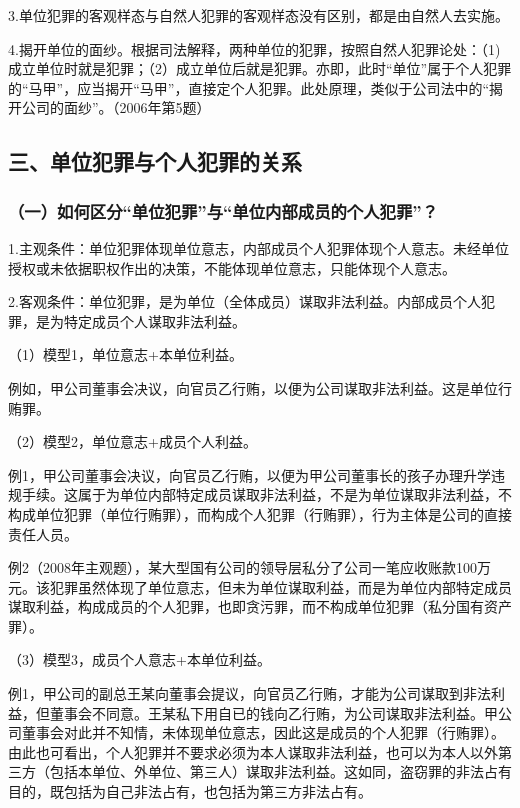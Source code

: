 3.单位犯罪的客观样态与自然人犯罪的客观样态没有区别，都是由自然人去实施。

4.揭开单位的面纱。根据司法解释，两种单位的犯罪，按照自然人犯罪论处：（1)成立单位时就是犯罪；（2）成立单位后就是犯罪。亦即，此时“单位”属于个人犯罪的“马甲”，应当揭开“马甲”，直接定个人犯罪。此处原理，类似于公司法中的“揭开公司的面纱”。（2006年第5题）

\subsection*{三、单位犯罪与个人犯罪的关系}

\subsubsection*{（一）如何区分“单位犯罪”与“单位内部成员的个人犯罪”？}

1.主观条件：单位犯罪体现单位意志，内部成员个人犯罪体现个人意志。未经单位授权或未依据职权作出的决策，不能体现单位意志，只能体现个人意志。

2.客观条件：单位犯罪，是为单位（全体成员）谋取非法利益。内部成员个人犯罪，是为特定成员个人谋取非法利益。


（1）模型1，单位意志+本单位利益。

例如，甲公司董事会决议，向官员乙行贿，以便为公司谋取非法利益。这是单位行贿罪。

（2）模型2，单位意志+成员个人利益。

例1，甲公司董事会决议，向官员乙行贿，以便为甲公司董事长的孩子办理升学违规手续。这属于为单位内部特定成员谋取非法利益，不是为单位谋取非法利益，不构成单位犯罪（单位行贿罪），而构成个人犯罪（行贿罪），行为主体是公司的直接责任人员。

例2（2008年主观题），某大型国有公司的领导层私分了公司一笔应收账款100万元。该犯罪虽然体现了单位意志，但未为单位谋取利益，而是为单位内部特定成员谋取利益，构成成员的个人犯罪，也即贪污罪，而不构成单位犯罪（私分国有资产罪）。

（3）模型3，成员个人意志+本单位利益。

例1，甲公司的副总王某向董事会提议，向官员乙行贿，才能为公司谋取到非法利益，但董事会不同意。王某私下用自已的钱向乙行贿，为公司谋取非法利益。甲公司董事会对此并不知情，未体现单位意志，因此这是成员的个人犯罪（行贿罪）。由此也可看出，个人犯罪并不要求必须为本人谋取非法利益，也可以为本人以外第三方（包括本单位、外单位、第三人）谋取非法利益。这如同，盗窃罪的非法占有目的，既包括为自己非法占有，也包括为第三方非法占有。

